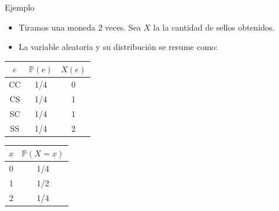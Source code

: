 \documentclass[handout]{beamer}
\begin{document}
\begin{frame}{Ejemplo}

\begin{itemize}
 \item Tiramos una moneda 2 veces. Sea $X$ la la cantidad de sellos obtenidos.
 \item La variable aleatoria y su distribución se resume como:
\end{itemize}

\begin{table}
\begin{tabular}{c c|c}
\hline
 $e$ & $\mathbb{P}(e)$ & $X(e)$   \\ 
\hline
CC & 1/4 & 0 \\
CS & 1/4 & 1 \\
SC & 1/4 & 1 \\
SS & 1/4 & 2 \\
\hline
\end{tabular}
\end{table}

\begin{table}
\begin{tabular}{c|c}
\hline
 $x$ & $\mathbb{P}(X = x)$   \\ 
\hline
0 & 1/4 \\
1 & 1/2  \\
2 & 1/4  \\
\hline
\end{tabular}
\end{table}

\end{frame}
\end{document}
